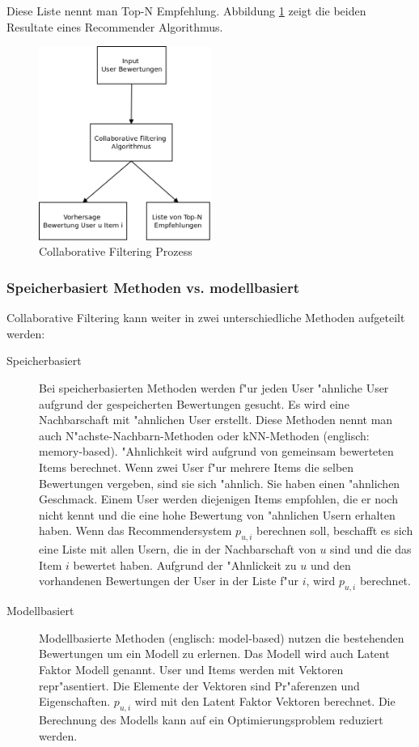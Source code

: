 \documentclass[a4paper, 12pt]{article}
\begin{document}
Diese Liste nennt man Top-N Empfehlung. Abbildung \ref{fig:cfprocess} zeigt die beiden Resultate eines Recommender Algorithmus.

\begin{figure}
  \centering
      \includegraphics[width=0.5\textwidth]{cf}
  \caption{Collaborative Filtering Prozess}
  \label{fig:cfprocess}
\end{figure}

\subsubsection{Speicherbasiert Methoden vs. modellbasiert}
\label{sec:cfmodels}

Collaborative Filtering kann weiter in zwei unterschiedliche Methoden aufgeteilt werden:

\begin{description}
\item[Speicherbasiert] Bei speicherbasierten Methoden werden f"ur jeden User "ahnliche User aufgrund der gespeicherten Bewertungen gesucht. Es wird eine Nachbarschaft mit "ahnlichen User erstellt. Diese Methoden nennt man auch N"achste-Nachbarn-Methoden oder kNN-Methoden (englisch: memory-based).
"Ahnlichkeit wird aufgrund von gemeinsam bewerteten Items berechnet. Wenn zwei User f"ur mehrere Items die selben Bewertungen vergeben, sind sie sich "ahnlich. Sie haben einen "ahnlichen Geschmack. Einem User werden diejenigen Items empfohlen, die er noch nicht kennt und die eine hohe Bewertung von "ahnlichen Usern erhalten haben.
Wenn das Recommendersystem $p_{u,i}$ berechnen soll, beschafft es sich eine Liste mit allen Usern, die in der Nachbarschaft von $u$ sind und die das Item $i$ bewertet haben. Aufgrund der "Ahnlickeit zu $u$ und den vorhandenen Bewertungen der User in der Liste f"ur $i$, wird $p_{u,i}$ berechnet.
\item[Modellbasiert] Modellbasierte Methoden (englisch: model-based) nutzen die bestehenden Bewertungen um ein Modell zu erlernen. Das Modell wird auch Latent Faktor Modell genannt. User und Items werden mit Vektoren repr"asentiert. Die Elemente der Vektoren sind Pr"aferenzen und Eigenschaften.  $p_{u,i}$ wird mit den Latent Faktor Vektoren berechnet. Die Berechnung des Modells kann auf ein Optimierungsproblem reduziert werden.
\end{description}
\end{document}
